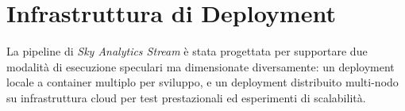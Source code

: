 \documentclass[conference]{IEEEtran}
\begin{document}
\section{Infrastruttura di Deployment}\label{sec:deployment_infrastructure}

La pipeline di \textit{Sky Analytics Stream} è stata progettata per supportare due modalità di esecuzione speculari ma dimensionate diversamente: un deployment locale a container multiplo per sviluppo, e un deployment distribuito multi-nodo su infrastruttura cloud per test prestazionali ed esperimenti di scalabilità.

% 
% 
% 
\end{document}
